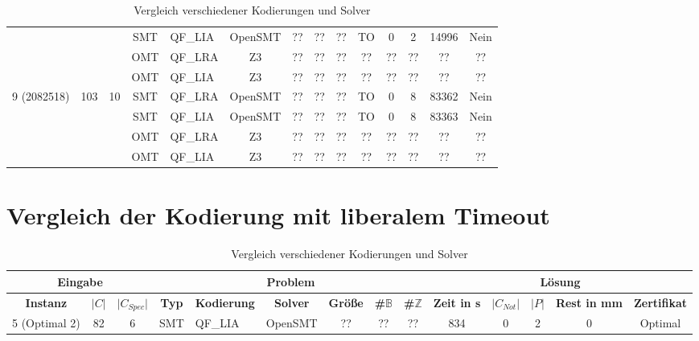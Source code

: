 \begin{landscape}
\begin{table}[H]
\begin{tabular}{|c|c|c|c|l|c|c|c|c|c|c|c|c|c|}
            & & & SMT & QF\_LIA & OpenSMT & ?? & ?? & ?? & TO & 0 & 2 & 14996 & Nein \\
            & & & OMT & QF\_LRA & Z3 & ?? & ?? & ?? & ?? & ?? & ?? & ?? & ?? \\
            & & & OMT & QF\_LIA & Z3 & ?? & ?? & ?? & ?? & ?? & ?? & ?? & ?? \\
            \hline %
            \multirow{4}{*}{9 (2082518)} & \multirow{4}{*}{103} & \multirow{4}{*}{10} & SMT & QF\_LRA & OpenSMT & ?? & ?? & ?? & TO & 0 & 8 & 83362 & Nein \\
            & & & SMT & QF\_LIA & OpenSMT & ?? & ?? & ?? & TO & 0 & 8 & 83363 & Nein \\
            & & & OMT & QF\_LRA & Z3 & ?? & ?? & ?? & ?? & ?? & ?? & ?? & ?? \\
            & & & OMT & QF\_LIA & Z3 & ?? & ?? & ?? & ?? & ?? & ?? & ?? & ?? \\
            \hline
        \end{tabular}
        \caption{Vergleich verschiedener Kodierungen und Solver}
        \label{tab:vglkodierungreal}
    \end{table}
\end{landscape}

\section{Vergleich der Kodierung mit liberalem Timeout}
\begin{landscape}
    \begin{table}[H]
        \centering
        \begin{tabular}{|c|c|c|c|l|c|c|c|c|c|c|c|c|c|}
            \hline
            \multicolumn{3}{|c|}{\textbf{Eingabe}} & \multicolumn{6}{|c|}{\textbf{Problem}} & \multicolumn{5}{|c|}{\textbf{Lösung}} \\
            \hline
            \textbf{Instanz} & \textbf{$\lvert C \rvert$} & \textbf{$\lvert C_{Spec} \rvert$} & \textbf{Typ} & \textbf{Kodierung} & \textbf{Solver} & \textbf{Größe} & \textbf{\#$\mathbb{B}$} & \textbf{\#$\mathbb{Z}$} & \textbf{Zeit in s} & \textbf{$\lvert C_{Not} \rvert$} & \textbf{$\lvert P \rvert$} & \textbf{Rest in mm} & \textbf{Zertifikat} \\
            \hline

            \hline
            5 (Optimal 2) & 82 & 6 & SMT & QF\_LIA & OpenSMT & ?? & ?? & ?? & 834 & 0 & 2 & 0 & Optimal \\
            \hline
        \end{tabular}
        \caption{Vergleich verschiedener Kodierungen und Solver}
        \label{tab:vglkodierungliberal}
    \end{table}
\end{landscape}